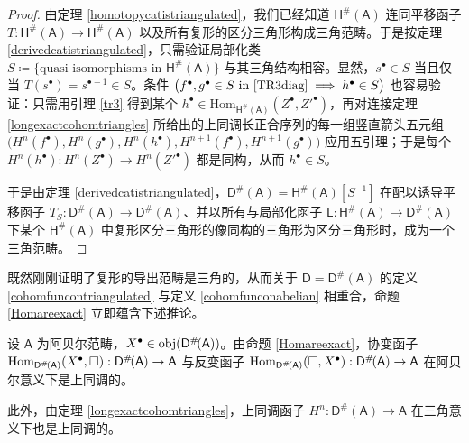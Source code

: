 \begin{proof}
	由定理 \ref{homotopycatistriangulated}，我们已经知道 $\mathsf{H^\#\!(A)}$ 连同平移函子 $T:\mathsf{H^\#\!(A)}\rightarrow\mathsf{H^\#\!(A)}$ 以及所有复形的区分三角形构成三角范畴。于是按定理 \ref{derivedcatistriangulated}，只需验证局部化类 $S\coloneqq\{\text{quasi-isomorphisms in }\mathsf{H^\#\!(A)}\}$ 与其三角结构相容。显然，$s^\bullet\in S$ 当且仅当 $T(s^\bullet)=s^{\bullet+1}\in S$。条件 $\big(f^\bullet,g^\bullet\in S\text{ in }\eqref{TR3diag}\implies h^\bullet\in S\big)$ 也容易验证：只需用引理 \ref{tr3} 得到某个 $h^\bullet\in\text{Hom}_\mathsf{H^\#\!(A)}(Z^\bullet,Z'^\bullet)$，再对连接定理 \ref{longexactcohomtriangles} 所给出的上同调长正合序列的每一组竖直箭头五元组 $\big(H^n(f^\bullet),H^n(g^\bullet),H^n(h^\bullet),H^{n+1}(f^\bullet), H^{n+1}(g^\bullet)\big)$ 应用五引理；于是每个 $H^n(h^\bullet):H^n(Z^\bullet)\rightarrow H^n(Z'^\bullet)$ 都是同构，从而 $h^\bullet\in S$。
	
	于是由定理 \ref{derivedcatistriangulated}，$\mathsf{D^\#\!(A)}=\mathsf{H^\#\!(A)}[S^{-1}]$ 在配以诱导平移函子 $T_S:\mathsf{D^\#\!(A)}\rightarrow\mathsf{D^\#\!(A)}$、并以所有与局部化函子 $\mathsf{L}:\mathsf{H^\#\!(A)}\rightarrow\mathsf{D^\#\!(A)}$ 下某个 $\mathsf{H^\#\!(A)}$ 中复形区分三角形的像同构的三角形为区分三角形时，成为一个三角范畴。
\end{proof}

既然刚刚证明了复形的导出范畴是三角的，从而关于 $\mathsf{D}=\mathsf{D^\#\!(A)}$ 的定义 \ref{cohomfuncontriangulated} 与定义 \ref{cohomfunconabelian} 相重合，命题 \ref{Homareexact} 立即蕴含下述推论。

\begin{Cor}\label{Homarecohomological}
	设 $\mathsf{A}$ 为阿贝尔范畴，$X^\bullet\in\textup{obj}(\mathsf{D^\#\!(A)})$。由命题 \ref{Homareexact}，协变函子 $\textup{Hom}_\mathsf{D^\#\!(A)}(X^\bullet,\square):\mathsf{D^\#\!(A)}\rightarrow\mathsf{A}$ 与反变函子 $\textup{Hom}_\mathsf{D^\#\!(A)}(\square,X^\bullet):\mathsf{D^\#\!(A)}\rightarrow\mathsf{A}$ 在阿贝尔意义下是上同调的。
	
	此外，由定理 \ref{longexactcohomtriangles}，上同调函子 $H^n:\mathsf{D^\#\!(A)}\rightarrow\mathsf{A}$ 在三角意义下也是上同调的。
\end{Cor}

